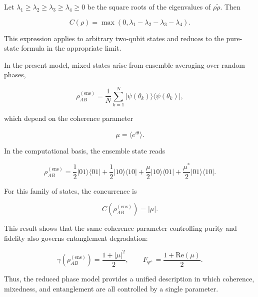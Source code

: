 Let \( \lambda_1 \ge \lambda_2 \ge \lambda_3 \ge \lambda_4 \ge 0 \) be the square roots of the eigenvalues of \( \rho\tilde{\rho} \). Then

\begin{equation}
C(\rho)
=
\max
\left(
0,
\lambda_1-\lambda_2-\lambda_3-\lambda_4
\right).
\label{eq:mixed_state_concurrence}
\end{equation}

This expression applies to arbitrary two-qubit states and reduces to the pure-state formula in the appropriate limit.

\medskip

In the present model, mixed states arise from ensemble averaging over random phases,

\[
\rho_{AB}^{(\mathrm{ens})}
=
\frac{1}{N}
\sum_{k=1}^{N}
|\psi(\theta_k)\rangle\langle\psi(\theta_k)|,
\]

which depend on the coherence parameter

\[
\mu
=
\langle e^{i\theta}\rangle.
\]

In the computational basis, the ensemble state reads

\begin{equation}
\rho_{AB}^{(\mathrm{ens})}
=
\frac{1}{2}|01\rangle\langle 01|
+
\frac{1}{2}|10\rangle\langle 10|
+
\frac{\mu}{2}|10\rangle\langle 01|
+
\frac{\mu^*}{2}|01\rangle\langle 10|.
\label{eq:random_phase_ensemble_density_explicit}
\end{equation}

For this family of states, the concurrence is

\begin{equation}
C
\left(
\rho_{AB}^{(\mathrm{ens})}
\right)
=
|\mu|.
\label{eq:random_phase_ensemble_concurrence}
\end{equation}

\medskip

This result shows that the same coherence parameter controlling purity and fidelity also governs entanglement degradation:

\[
\gamma
\left(
\rho_{AB}^{(\mathrm{ens})}
\right)
=
\frac{1+|\mu|^2}{2},
\qquad
F_{\Psi^+}
=
\frac{1+\mathrm{Re}(\mu)}{2}.
\]

Thus, the reduced phase model provides a unified description in which coherence, mixedness, and entanglement are all controlled by a single parameter.



